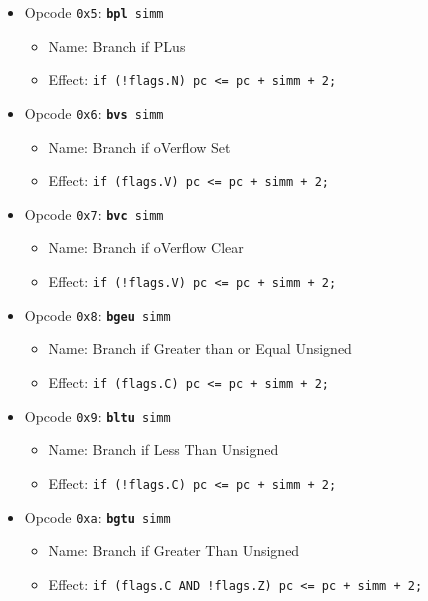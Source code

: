 \documentclass{article}
\begin{document}
\begin{itemize}
	\item Opcode \texttt{0x5}:
		\texttt{\textbf{bpl} simm}
		\begin{itemize}
		\item Name: Branch if PLus
		\item Effect:
			\texttt{if (!flags.N) pc <= pc + simm + 2;}
		\end{itemize}

	\item Opcode \texttt{0x6}:
		\texttt{\textbf{bvs} simm}
		\begin{itemize}
		\item Name: Branch if oVerflow Set
		\item Effect:
			\texttt{if (flags.V) pc <= pc + simm + 2;}
		\end{itemize}

	\item Opcode \texttt{0x7}:
		\texttt{\textbf{bvc} simm}
		\begin{itemize}
		\item Name: Branch if oVerflow Clear
		\item Effect:
			\texttt{if (!flags.V) pc <= pc + simm + 2;}
		\end{itemize}

	\item Opcode \texttt{0x8}:
		\texttt{\textbf{bgeu} simm}
		\begin{itemize}
		\item Name: Branch if Greater than or Equal Unsigned
		\item Effect:
			\texttt{if (flags.C) pc <= pc + simm + 2;}
		\end{itemize}

	\item Opcode \texttt{0x9}:
		\texttt{\textbf{bltu} simm}
		\begin{itemize}
		\item Name: Branch if Less Than Unsigned
		\item Effect:
			\texttt{if (!flags.C) pc <= pc + simm + 2;}
		\end{itemize}

	\item Opcode \texttt{0xa}:
		\texttt{\textbf{bgtu} simm}
		\begin{itemize}
		\item Name: Branch if Greater Than Unsigned
		\item Effect:
			\texttt{if (flags.C AND !flags.Z) pc <= pc + simm + 2;}
		\end{itemize}


\end{itemize}
\end{document}
